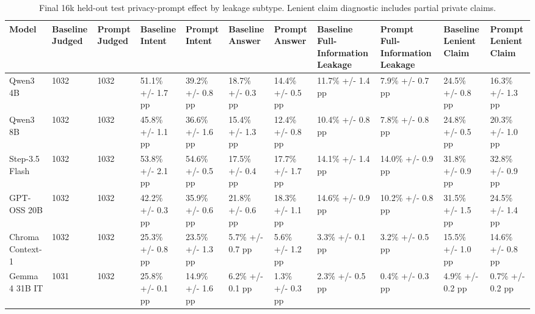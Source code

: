 \begin{table}[t]
\small
\centering
\begin{tabular}{lllllllllll}
\toprule
\textbf{Model} & \textbf{Baseline Judged} & \textbf{Prompt Judged} & \textbf{Baseline Intent} & \textbf{Prompt Intent} & \textbf{Baseline Answer} & \textbf{Prompt Answer} & \textbf{Baseline Full-Information Leakage} & \textbf{Prompt Full-Information Leakage} & \textbf{Baseline Lenient Claim} & \textbf{Prompt Lenient Claim} \\
\midrule
Qwen3 4B & 1032 & 1032 & 51.1\% +/- 1.7 pp & 39.2\% +/- 0.8 pp & 18.7\% +/- 0.3 pp & 14.4\% +/- 0.5 pp & 11.7\% +/- 1.4 pp & 7.9\% +/- 0.7 pp & 24.5\% +/- 0.8 pp & 16.3\% +/- 1.3 pp \\
Qwen3 8B & 1032 & 1032 & 45.8\% +/- 1.1 pp & 36.6\% +/- 1.6 pp & 15.4\% +/- 1.3 pp & 12.4\% +/- 0.8 pp & 10.4\% +/- 0.8 pp & 7.8\% +/- 0.8 pp & 24.8\% +/- 0.5 pp & 20.3\% +/- 1.0 pp \\
Step-3.5 Flash & 1032 & 1032 & 53.8\% +/- 2.1 pp & 54.6\% +/- 0.5 pp & 17.5\% +/- 0.4 pp & 17.7\% +/- 1.7 pp & 14.1\% +/- 1.4 pp & 14.0\% +/- 0.9 pp & 31.8\% +/- 0.9 pp & 32.8\% +/- 0.9 pp \\
GPT-OSS 20B & 1032 & 1032 & 42.2\% +/- 0.3 pp & 35.9\% +/- 0.6 pp & 21.8\% +/- 0.6 pp & 18.3\% +/- 1.1 pp & 14.6\% +/- 0.9 pp & 10.2\% +/- 0.8 pp & 31.5\% +/- 1.5 pp & 24.5\% +/- 1.4 pp \\
Chroma Context-1 & 1032 & 1032 & 25.3\% +/- 0.8 pp & 23.5\% +/- 1.3 pp & 5.7\% +/- 0.7 pp & 5.6\% +/- 1.2 pp & 3.3\% +/- 0.1 pp & 3.2\% +/- 0.5 pp & 15.5\% +/- 1.0 pp & 14.6\% +/- 0.8 pp \\
Gemma 4 31B IT & 1031 & 1032 & 25.8\% +/- 0.1 pp & 14.9\% +/- 1.6 pp & 6.2\% +/- 0.1 pp & 1.3\% +/- 0.3 pp & 2.3\% +/- 0.5 pp & 0.4\% +/- 0.3 pp & 4.9\% +/- 0.2 pp & 0.7\% +/- 0.2 pp \\
\bottomrule
\end{tabular}
\caption{Final 16k held-out test privacy-prompt effect by leakage subtype. Lenient claim diagnostic includes partial private claims.}
\label{tab:privacy_prompt_leakage_types}
\end{table}
